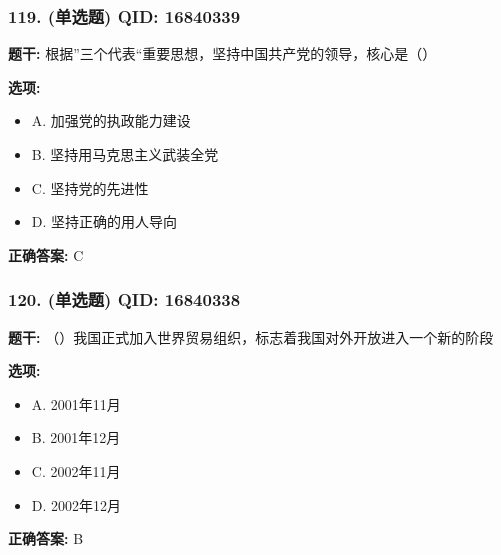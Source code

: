 \documentclass[12pt,UTF8]{ctexart}
\begin{document}
\vspace{0.3em}\hrulefill\vspace{0.7em}

\subsubsection*{119. (单选题) \small QID: 16840339}

\textbf{题干:}
根据”三个代表“重要思想，坚持中国共产党的领导，核心是（）

\textbf{选项:}
\begin{itemize}[leftmargin=*]

  \item A. 加强党的执政能力建设

  \item B. 坚持用马克思主义武装全党

  \item C. 坚持党的先进性

  \item D. 坚持正确的用人导向

\end{itemize}

\textbf{正确答案:}
C

\vspace{0.3em}\hrulefill\vspace{0.7em}

\subsubsection*{120. (单选题) \small QID: 16840338}

\textbf{题干:}
（）我国正式加入世界贸易组织，标志着我国对外开放进入一个新的阶段

\textbf{选项:}
\begin{itemize}[leftmargin=*]

  \item A. 2001年11月

  \item B. 2001年12月

  \item C. 2002年11月

  \item D. 2002年12月

\end{itemize}

\textbf{正确答案:}
B

\vspace{0.3em}\hrulefill\vspace{0.7em}
\end{document}
